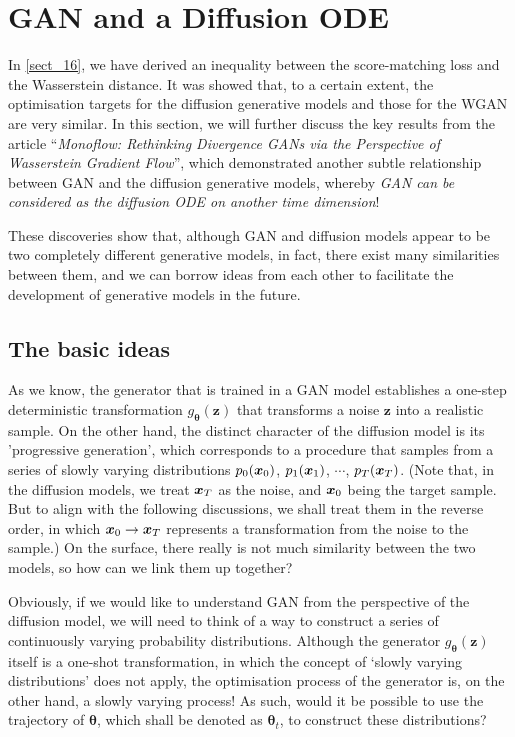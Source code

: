 \section{GAN and a Diffusion ODE}\label{sect_19}

In \cref{sect_16}, we have derived an inequality between the score-matching loss and the Wasserstein distance. It was showed that, to a certain extent, the optimisation targets for the diffusion generative models and those for the WGAN are very similar. In this section, we will further discuss the key results from the article ``\emph{Monoflow: Rethinking Divergence GANs via the Perspective of Wasserstein Gradient Flow}''\cite{yi2024monoflow}, which demonstrated another subtle relationship between GAN and the diffusion generative models, whereby \emph{GAN can be considered as the diffusion ODE on another time dimension}!

These discoveries show that, although GAN and diffusion models appear to be two completely different generative models, in fact, there exist many similarities between them, and we can borrow ideas from each other to facilitate the development of generative models in the future.

\subsection{The basic ideas}

As we know, the generator that is trained in a GAN model establishes a one-step deterministic transformation $g_{\bm{\theta}}(\bm{z})$ that transforms a noise $\bm{z}$ into a realistic sample. On the other hand, the distinct character of the diffusion model is its 'progressive generation', which corresponds to a procedure that samples from a series of slowly varying distributions $p_0(\bm{x}_0)$, $p_1(\bm{x}_1)$, $\cdots$, $p_T(\bm{x}_T)$. (Note that, in the diffusion models, we treat $\bm{x}_T$ as the noise, and $\bm{x}_0$ being the target sample. But to align with the following discussions, we shall treat them in the reverse order, in which $\bm{x}_0\to\bm{x}_T$ represents a transformation from the noise to the sample.) On the surface, there really is not much similarity between the two models, so how can we link them up together?


Obviously, if we would like to understand GAN from the perspective of the diffusion model, we will need to think of a way to construct a series of continuously varying probability distributions. Although the generator $g_{\bm{\theta}}(\bm{z})$ itself is a one-shot transformation, in which the concept of `slowly varying distributions' does not apply, the optimisation process of the generator is, on the other hand, a slowly varying process! As such, would it be possible to use the trajectory of $\bm{\theta}$, which shall be denoted as $\bm{\theta}_t$, to construct these distributions? 

